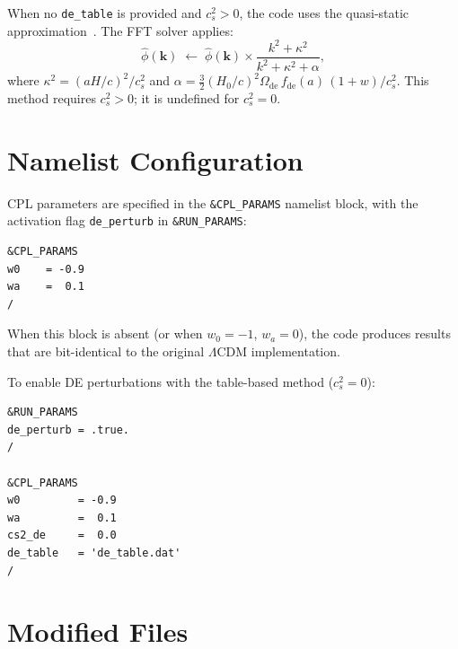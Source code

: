 \documentclass[11pt,fleqn]{book}
\begin{document}
When no \texttt{de\_table} is provided and $c_s^2 > 0$, the code uses the
quasi-static approximation~\cite{Bean2004}.  The FFT solver applies:
\begin{equation}\label{eq:de_factor_qs}
  \hat\phi(\mathbf{k}) \;\leftarrow\; \hat\phi(\mathbf{k}) \times
  \frac{k^2 + \kappa^2}{k^2 + \kappa^2 + \alpha},
\end{equation}
where $\kappa^2 = (aH/c)^2/c_s^2$ and $\alpha = \frac{3}{2}(H_0/c)^2
\Omega_{\mathrm{de}}\,f_{\mathrm{de}}(a)\,(1+w)/c_s^2$.  This method
requires $c_s^2 > 0$; it is undefined for $c_s^2 = 0$.

\section{Namelist Configuration}

CPL parameters are specified in the \texttt{\&CPL\_PARAMS} namelist block,
with the activation flag \texttt{de\_perturb} in \texttt{\&RUN\_PARAMS}:
\begin{codebox}
\begin{lstlisting}[style=fortran,numbers=none]
&CPL_PARAMS
w0    = -0.9
wa    =  0.1
/
\end{lstlisting}
\end{codebox}
When this block is absent (or when $w_0 = -1$, $w_a = 0$), the code produces results that are bit-identical to the original $\Lambda$CDM implementation.

To enable DE perturbations with the table-based method ($c_s^2 = 0$):
\begin{codebox}
\begin{lstlisting}[style=fortran,numbers=none]
&RUN_PARAMS
de_perturb = .true.
/

&CPL_PARAMS
w0         = -0.9
wa         =  0.1
cs2_de     =  0.0
de_table   = 'de_table.dat'
/
\end{lstlisting}
\end{codebox}

\section{Modified Files}
\end{document}
